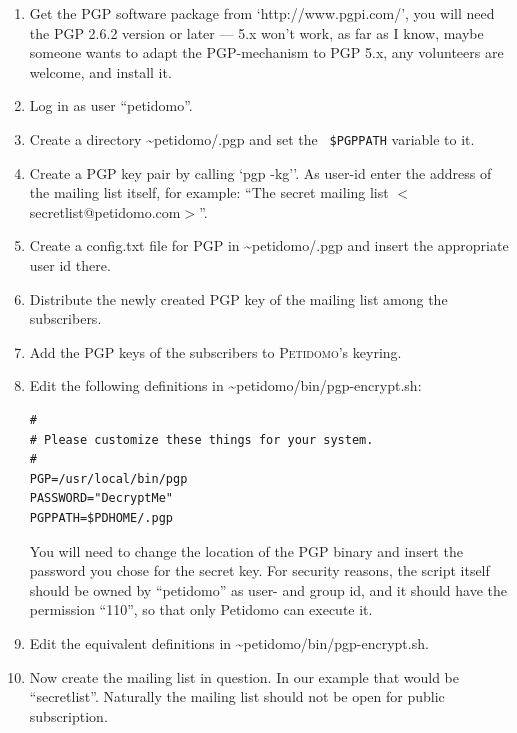 \documentclass[a4paper,10pt]{scrreprt}
\newcommand{\Petidomo}{{\scshape Peti\-domo}}
\newcommand{\file}[1]{{\sf #1}}
\begin{document}
\begin{enumerate}

\item Get the PGP software package from `http://www.pgpi.com/', you
will need the PGP 2.6.2 version or later --- 5.x won't work, as far as
I know, maybe someone wants to adapt the PGP-mechanism to PGP 5.x, any
volunteers are welcome, and install it.

\item Log in as user ``petidomo''.

\item Create a directory \file{\~{}petidomo/.pgp} and set the {\tt
\$PGPPATH} variable to it.

\item Create a PGP key pair by calling `pgp -kg''. As user-id enter
the address of the mailing list itself, for example: ``The secret
mailing list $<$secretlist@petidomo.com$>$''.

\item Create a \file{config.txt} file for PGP in
\file{\~{}petidomo/.pgp} and insert the appropriate user id there.

\item Distribute the newly created PGP key of the mailing list among
the subscribers.

\item Add the PGP keys of the subscribers to \Petidomo's keyring.

\item Edit the following definitions in
\file{\~{}petidomo/bin/pgp-encrypt.sh}:

\begin{verbatim}
#
# Please customize these things for your system.
#
PGP=/usr/local/bin/pgp
PASSWORD="DecryptMe"
PGPPATH=$PDHOME/.pgp
\end{verbatim}

You will need to change the location of the PGP binary and insert the
password you chose for the secret key. For security reasons, the
script itself should be owned by ``petidomo'' as user- and group id,
and it should have the permission ``110'', so that only Petidomo can
execute it.

\item Edit the equivalent definitions in
\file{\~{}petidomo/bin/pgp-encrypt.sh}.

\item Now create the mailing list in question. In our example that
would be ``secretlist''. Naturally the mailing list should not be open
for public subscription.


\end{enumerate}
\end{document}
